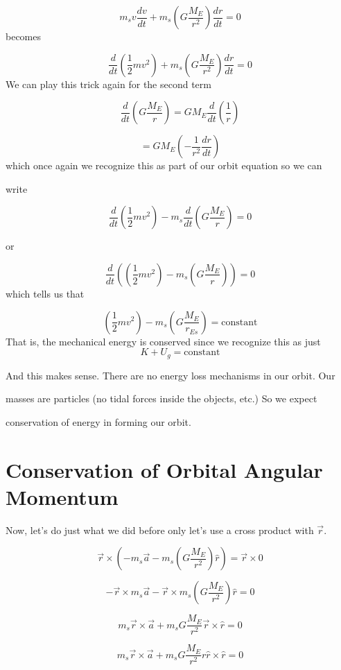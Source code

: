 $$m_{s}v\frac{dv}{dt}+m_{s}\left( G\frac{M_{E}}{r^{2}}\right) \frac{dr}{dt}=0
$$%
becomes 

$$\frac{d}{dt}\left( \frac{1}{2}mv^{2}\right) +m_{s}\left( G\frac{M_{E}}{r^{2}}\right) \frac{dr}{dt}=0$$%
We can play this trick again for the second term%

$$
\frac{d}{dt}\left( G\frac{M_{E}}{r}\right) =GM_{E}\frac{d}{dt}\left( \frac{1}{r}\right) 
$$
	
$$
=GM_{E}\left( -\frac{1}{r^{2}}\frac{dr}{dt}\right) 
$$
which once again we recognize this as part of our orbit equation so we can

write 

$$\frac{d}{dt}\left( \frac{1}{2}mv^{2}\right) -m_{s}\frac{d}{dt}\left( G\frac{M_{E}}{r}\right) =0$$

or 

$$\frac{d}{dt}\left( \left( \frac{1}{2}mv^{2}\right) -m_{s}\left( G\frac{M_{E}}{r}\right) \right) =0 
$$%
which tells us that 

$$
\left( \frac{1}{2}mv^{2}\right) -m_{s}\left( G\frac{M_{E}}{r_{Es}}\right) =\text{constant} 
$$
That is, the mechanical energy is conserved since we recognize this as just 
$$K+U_{g}=\text{constant} $$

And this makes sense. There are no energy loss mechanisms in our orbit. Our

masses are particles (no tidal forces inside the objects, etc.) So we expect

conservation of energy in forming our orbit.


\section{Conservation of Orbital Angular Momentum}


Now, let's do just what we did before only let's use a cross product with 
$\overrightarrow{r}$. 

$$\overrightarrow{r}\times \left( -m_{s}\overrightarrow{a}-m_{s}\left( G\frac{M_{E}}{r^{2}}\right) \hat{r}\right) =\overrightarrow{r}\times 0
$$

$$-\overrightarrow{r}\times m_{s}\overrightarrow{a}-\overrightarrow{r}\times m_{s}\left( G\frac{M_{E}}{r^{2}}\right) \hat{r}=0
$$

$$m_{s}\overrightarrow{r}\times \overrightarrow{a}+m_{s}G\frac{M_{E}}{r^{2}}\overrightarrow{r}\times \hat{r}=0
$$

$$m_{s}\overrightarrow{r}\times \overrightarrow{a}+m_{s}G\frac{M_{E}}{r^{2}}r\hat{r}\times \hat{r}=0
$$


